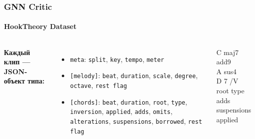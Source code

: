 \documentclass[aspectratio=169]{beamer}
\begin{document}
\begin{frame}
\frametitle{GNN Critic}
\framesubtitle{HookTheory Dataset}
\vspace{0.05cm}
	 \begin{columns}[T,totalwidth=\textwidth]
		{\fontsize{12.5}{16}\selectfont\raggedright
		\textbf{Каждый клип --- JSON-объект типа:}\\[0.25cm]
		\begin{itemize}
			\setlength{\itemsep}{0.2cm}
			\item \texttt{meta}: \texttt{split}, \texttt{key}, \texttt{tempo}, \texttt{meter}
			\item \texttt{[melody]}: \texttt{beat}, \texttt{duration}, \texttt{scale}, \texttt{degree}, \texttt{octave}, \texttt{rest flag}
			\item \texttt{[chords]}: \texttt{beat}, \texttt{duration}, \textcolor{HSEblue}{\texttt{root}}, \textcolor{HSEgreen}{\texttt{type}}, \textcolor{ChordInversion}{\texttt{inversion}}, \textcolor{ChordApplied}{\texttt{applied}}, \textcolor{HSEorange}{\texttt{adds}}, \textcolor{ChordOmit}{\texttt{omits}}, \textcolor{ChordAlteration}{\texttt{alterations}}, \texttt{suspensions}, \textcolor{ChordBorrowed}{\texttt{borrowed}}, \texttt{rest flag}
		\end{itemize}
		}
		\begin{center}
			{\fontsize{28}{34}\selectfont
			\textcolor{HSEblue}{C}%
			\textcolor{HSEgreen}{maj7}%
			\textcolor{HSEorange}{add9}}\\[0.28cm]
			{\fontsize{28}{34}\selectfont
			\textcolor{HSEblue}{A}%
			\textcolor{HSEred}{sus4}}\\[0.28cm]
			{\fontsize{28}{34}\selectfont
			\textcolor{HSEblue}{D}%
			\textcolor{HSEgreen}{7}%
			\textcolor{ChordApplied}{/V}}\\[0.45cm]
			{\fontsize{10}{12}\selectfont
			\textcolor{HSEblue}{root}\quad
			\textcolor{HSEgreen}{type}\quad
			\textcolor{HSEorange}{adds}\quad
			\textcolor{HSEred}{suspensions}\\[0.08cm]
			\textcolor{ChordApplied}{applied}}
		\end{center}
	\end{columns}
\end{frame}
\end{document}
